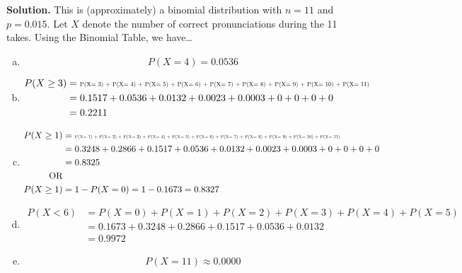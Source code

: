 \documentclass[12pt,letterpaper]{exam}
\begin{document}
\begin{questions}
 \pspace

{\noindent\bfseries Solution.} This is (approximately) a binomial distribution with $n= 11$ and $p= 0.015$. Let $X$ denote the number of correct pronunciations during the 11 takes. Using the Binomial Table, we have\dots

\begin{enumerate}[(a)]
\item 
	\[
	P(X= 4)= 0.0536
	\]

\item 
	\[
	\begin{aligned}
	P(X \geq 3)&= \resizebox{0.85\textwidth}{!}{P(X= 3) + P(X= 4) + P(X= 5) + P(X= 6) + P(X= 7) + P(X= 8) + P(X= 9) + P(X= 10) + P(X= 11)} \\
	&= 0.1517 + 0.0536 + 0.0132 + 0.0023 + 0.0003 + 0 + 0 + 0 + 0 \\
	&= 0.2211
	\end{aligned}
	\]

\item 
	\[
	\begin{aligned}
	P(X \geq 1)&= \resizebox{0.85\textwidth}{!}{P(X= 1) + P(X= 2) + P(X= 3) + P(X= 4) + P(X= 5) + P(X= 6) + P(X= 7) + P(X= 8) + P(X= 9) + P(X= 10) + P(X= 11)} \\
	&= 0.3248 + 0.2866 + 0.1517 + 0.0536 + 0.0132 + 0.0023 + 0.0003 + 0 + 0 + 0 + 0 \\
	&= 0.8325 \\
	\text{OR} \\
	P(X \geq 1)&= 1 - P(X= 0)= 1 - 0.1673= 0.8327
	\end{aligned}
	\]

\item 
	\[
	\begin{aligned}
	P(X < 6)&= P(X= 0) + P(X= 1) + P(X= 2) + P(X= 3) + P(X= 4) + P(X= 5) \\
	&= 0.1673 + 0.3248 + 0.2866 + 0.1517 + 0.0536 + 0.0132 \\
	&= 0.9972
	\end{aligned}
	\]

\item 
	\[
	P(X= 11) \approx 0.0000
	\]
\end{enumerate}

\end{questions}
\end{document}
